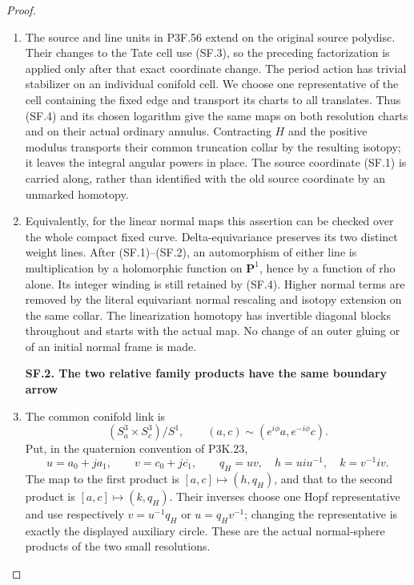 \begin{proof}
\begin{enumerate}[label=\arabic*.]
\item The source and line units in P3F.56 extend on the original source
polydisc. Their changes to the Tate cell use (SF.3), so the preceding
factorization is applied only after that exact coordinate change.
The period action has trivial stabilizer on an individual conifold
cell. We choose one representative of the cell containing the fixed
edge and transport its charts to all translates. Thus (SF.4) and its
chosen logarithm give the same maps on both resolution charts and
on their actual ordinary annulus. Contracting \(H\) and the positive
modulus transports their common truncation collar by the resulting
isotopy; it leaves the integral angular powers in place. The source
coordinate (SF.1) is carried along, rather than identified with the
old source coordinate by an unmarked homotopy.

\item Equivalently, for the linear normal maps this assertion can be checked
over the whole compact fixed curve. Delta-equivariance preserves its
two distinct weight lines. After (SF.1)--(SF.2), an automorphism of
either line is multiplication by a holomorphic function on
\(\mathbf P^1\), hence by a function of rho alone. Its integer winding
is still retained by (SF.4). Higher normal terms are removed by the
literal equivariant normal rescaling and isotopy extension on the
same collar. The linearization homotopy has invertible diagonal
blocks throughout and starts with the actual map. No change of an
outer gluing or of an initial normal frame is made.

\par

\medskip\noindent\textbf{SF.2. The two relative family products have the same boundary arrow}

\par\nobreak

\item The common conifold link is
\[
 (S^3_a\times S^3_c)/S^1,\qquad
 (a,c)\sim(e^{i\phi}a,e^{-i\phi}c).
\]
Put, in the quaternion convention of P3K.23,
\[
 u=a_0+ja_1,\qquad v=c_0+j\overline{c_1},\qquad
 q_H=uv,\quad h=uiu^{-1},\quad k=v^{-1}iv.                 \tag{SF.5}
\]
The map to the first product is \([a,c]\mapsto(h,q_H)\), and that to
the second product is \([a,c]\mapsto(k,q_H)\). Their inverses choose
one Hopf representative and use respectively \(v=u^{-1}q_H\) or
\(u=q_Hv^{-1}\); changing the representative is exactly the displayed
auxiliary circle. These are the actual normal-sphere products of the
two small resolutions.


\end{enumerate}
\end{proof}
